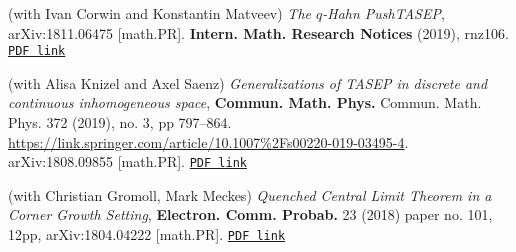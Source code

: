 \documentclass[letterpaper,11pt]{article}
\begin{document}
\begin{etaremune}
\item 
	(with Ivan Corwin and Konstantin Matveev)
	\emph{The $q$-Hahn PushTASEP},
	arXiv:1811.06475 [math.PR].
	\textbf{Intern. Math. Research Notices} (2019), rnz106.
		\href{https://storage.lpetrov.cc/research_files/Petrov-publ/30-publ-petrov-uva.pdf}{\texttt{PDF link}}	
\item 
	(with Alisa Knizel and
		Axel Saenz)
		\emph{Generalizations of TASEP in discrete and continuous inhomogeneous space},
		\textbf{Commun. Math. Phys.} 
		Commun. Math. Phys. 
		372 (2019), no. 3, pp 797–864.
		\url{https://link.springer.com/article/10.1007%2Fs00220-019-03495-4}.
		arXiv:1808.09855 [math.PR].
		\href{https://storage.lpetrov.cc/research_files/Petrov-publ/29-publ-petrov-uva.pdf}{\texttt{PDF link}}
\item (with Christian Gromoll, Mark Meckes)
		\emph{Quenched Central Limit Theorem in a Corner Growth Setting},
		\textbf{Electron. Comm. Probab.} 23 (2018) paper no. 101, 12pp,
		arXiv:1804.04222 [math.PR]. 
		\href{https://storage.lpetrov.cc/research_files/Petrov-publ/28-publ-petrov-uva.pdf}{\texttt{PDF link}}
	

\end{etaremune}
\end{document}

